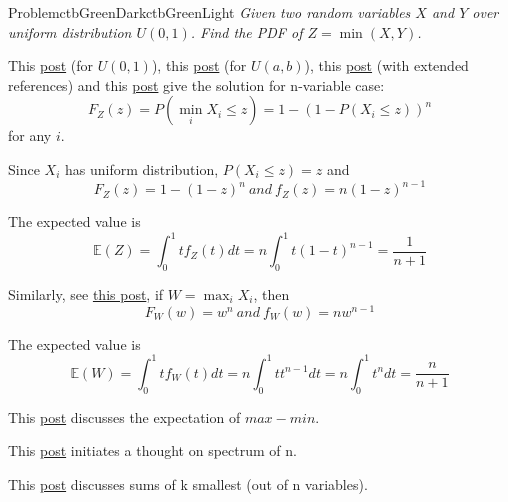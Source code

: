 \documentclass[12pt]{simple_doc}
\begin{document}

    \begin{cbstripe}{Problem}{ctbGreenDark}{ctbGreenLight}
        \textit{Given two random variables $X$ and $Y$ over uniform distribution $U(0, 1)$. Find
        the PDF of $Z = \min(X, Y)$.}
    \end{cbstripe}

    This \href{https://danieltakeshi.github.io/2016/09/25/the-expectation-of-the-minimum-of-iid-uniform-random-variables/}{post}
    (for $U(0, 1)$),
    this \href{https://math.stackexchange.com/questions/786392/expectation-of-minimum-of-n-i-i-d-uniform-random-variables}{post}
    (for $U(a, b)$),
    this \href{https://stats.stackexchange.com/questions/220/how-is-the-minimum-of-a-set-of-iid-random-variables-distributed}{post}
    (with extended references)
    and this \href{https://math.stackexchange.com/questions/308230/expectation-of-the-min-of-two-independent-random-variables}{post}
    give the solution for n-variable case:
    \begin{equation}
    F_Z(z) = P(\min_i X_i \leqslant z) = 1 - (1 - P(X_i \leqslant z))^n
    \end{equation}
    for any $i$.

    Since $X_i$ has uniform distribution, $P(X_i \leqslant z) = z$ and
    \begin{equation}
        F_Z(z) = 1 - (1 - z)^n \ and \ f_Z(z) = n(1 - z)^{n-1}
    \end{equation}

    The expected value is
    \begin{equation}
    \mathbb{E}(Z) = \int_0^1 tf_Z(t)dt = n \int_0^1 t(1-t)^{n-1} = \frac{1}{n+1}
    \end{equation}

    Similarly, see \href{https://math.stackexchange.com/questions/197299/expected-value-of-maximum-of-two-random-variables-from-uniform-distribution}{this post},
    if $\displaystyle  W = \max_i X_i$, then
    \begin{equation}
        F_W(w) = w^n \ and \ f_W(w) = nw^{n-1}
    \end{equation}

    The expected value is
    \begin{equation}
    \mathbb{E}(W) = \int_0^1 tf_W(t)dt = n \int_0^1 tt^{n-1} dt = n \int_0^1 t^{n}dt = \frac{n}{n+1}
    \end{equation}

    This \href{https://math.stackexchange.com/questions/1242784/the-maximum-and-minimum-of-five-independent-uniform-random-variables}{post}
    discusses the expectation of $max - min$.

    This \href{https://www.quora.com/What-is-the-distribution-of-the-maximum-or-minimum-of-two-independent-random-variables-with-an-arbitrary-distribution}{post}
    initiates a thought on spectrum of n.

    This \href{https://math.stackexchange.com/questions/1668099/what-is-the-expected-value-of-the-sum-of-the-k-out-of-a-set-of-n-smallest}{post}
    discusses sums of k smallest (out of n variables).
\end{document}
